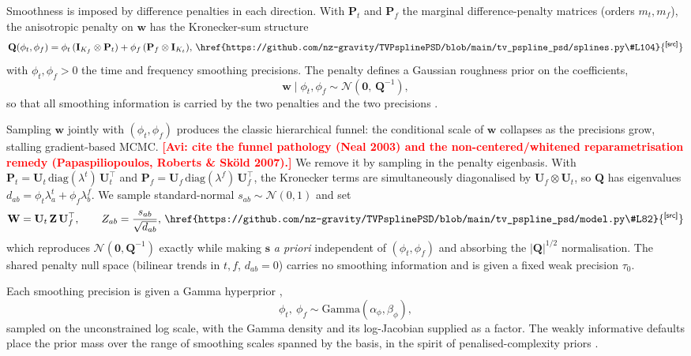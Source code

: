 \documentclass[
  aps,
  prd,
  twocolumn,
  amsmath,
  amssymb,
  nofootinbib,
  superscriptaddress,
  longbibliography,
]{revtex4-2}
\newcommand{\repobase}{https://github.com/nz-gravity/TVPsplinePSD/blob/main}
\DeclareRobustCommand{\codelink}[1]{\,\href{\repobase/#1}{\textsuperscript{\scriptsize\sffamily[src]}}}
\newcommand{\avi}[1]{\textcolor{red}{\textbf{[Avi: #1]}}}
\begin{document}
Smoothness is imposed by difference penalties in each direction. With
$\mathbf{P}_t$ and $\mathbf{P}_f$ the marginal difference-penalty matrices
(orders $m_t, m_f$), the anisotropic penalty on $\mathbf{w}$ has the
Kronecker-sum structure \citep{wood2017generalized}
\begin{equation}
\mathbf{Q}(\phi_t,\phi_f)
= \phi_t\,(\mathbf{I}_{K_f}\otimes\mathbf{P}_t)
+ \phi_f\,(\mathbf{P}_f\otimes\mathbf{I}_{K_t}),
\codelink{tv_pspline_psd/splines.py\#L104}
\label{eq:penalty}
\end{equation}
with $\phi_t, \phi_f > 0$ the time and frequency smoothing precisions. The
penalty defines a Gaussian roughness prior on the coefficients,
\begin{equation}
\mathbf{w}\mid\phi_t,\phi_f \sim \mathcal{N}\!\left(\mathbf{0},\,\mathbf{Q}^{-1}\right),
\label{eq:prior}
\end{equation}
so that all smoothing information is carried by the two penalties and the two
precisions \citep{lang2004bayesian,maturana2021bayesian,boer2023tensor}.

Sampling $\mathbf{w}$ jointly with $(\phi_t,\phi_f)$ produces the classic
hierarchical funnel: the conditional scale of $\mathbf{w}$ collapses as the
precisions grow, stalling gradient-based MCMC.
\avi{cite the funnel pathology (Neal 2003) and the non-centered/whitened
reparametrisation remedy (Papaspiliopoulos, Roberts \& Sk\"old 2007).}
We remove it by sampling in the
penalty eigenbasis. With $\mathbf{P}_t = \mathbf{U}_t\,\mathrm{diag}(\lambda^t)\,
\mathbf{U}_t^\top$ and $\mathbf{P}_f = \mathbf{U}_f\,\mathrm{diag}(\lambda^f)\,
\mathbf{U}_f^\top$, the Kronecker terms are simultaneously diagonalised by
$\mathbf{U}_f\otimes\mathbf{U}_t$, so $\mathbf{Q}$ has eigenvalues
$d_{ab} = \phi_t\lambda^t_a + \phi_f\lambda^f_b$. We sample standard-normal
$s_{ab}\sim\mathcal{N}(0,1)$ and set
\begin{equation}
\mathbf{W} = \mathbf{U}_t\,\mathbf{Z}\,\mathbf{U}_f^\top,
\qquad
Z_{ab} = \frac{s_{ab}}{\sqrt{d_{ab}}},
\codelink{tv_pspline_psd/model.py\#L82}
\label{eq:whitening}
\end{equation}
which reproduces $\mathcal{N}(\mathbf{0},\mathbf{Q}^{-1})$ exactly while making
$\mathbf{s}$ \emph{a priori} independent of $(\phi_t,\phi_f)$ and absorbing the
$|\mathbf{Q}|^{1/2}$ normalisation. The shared penalty null space (bilinear
trends in $t,f$, $d_{ab}=0$) carries no smoothing information and is given a
fixed weak precision $\tau_0$.

Each smoothing precision is given a Gamma hyperprior
\citep{maturana2021bayesian},
\begin{equation}
\phi_t,\ \phi_f \sim \mathrm{Gamma}(\alpha_\phi, \beta_\phi),
\end{equation}
sampled on the unconstrained log scale, with the Gamma density and its
log-Jacobian supplied as a factor. The weakly informative defaults place the
prior mass over the range of smoothing scales spanned by the basis, in the spirit
of penalised-complexity priors \citep{simpson2017penalising,yue2012priors}.
\end{document}
